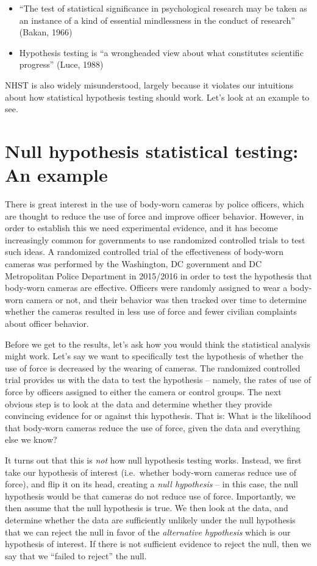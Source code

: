 \documentclass[]{book}
\providecommand{\tightlist}{%
  \setlength{\itemsep}{0pt}\setlength{\parskip}{0pt}}
\theoremstyle{definition}
\theoremstyle{definition}
\theoremstyle{definition}
\theoremstyle{remark}
\begin{document}
\begin{itemize}
\tightlist
\item
  ``The test of statistical significance in psychological research may
  be taken as an instance of a kind of essential mindlessness in the
  conduct of research'' (Bakan, 1966)
\item
  Hypothesis testing is ``a wrongheaded view about what constitutes
  scientific progress'' (Luce, 1988)
\end{itemize}

NHST is also widely misunderstood, largely because it violates our
intuitions about how statistical hypothesis testing should work. Let's
look at an example to see.

\section{Null hypothesis statistical testing: An
example}\label{null-hypothesis-statistical-testing-an-example}

There is great interest in the use of body-worn cameras by police
officers, which are thought to reduce the use of force and improve
officer behavior. However, in order to establish this we need
experimental evidence, and it has become increasingly common for
governments to use randomized controlled trials to test such ideas. A
randomized controlled trial of the effectiveness of body-worn cameras
was performed by the Washington, DC government and DC Metropolitan
Police Department in 2015/2016 in order to test the hypothesis that
body-worn cameras are effective. Officers were randomly assigned to wear
a body-worn camera or not, and their behavior was then tracked over time
to determine whether the cameras resulted in less use of force and fewer
civilian complaints about officer behavior.

Before we get to the results, let's ask how you would think the
statistical analysis might work. Let's say we want to specifically test
the hypothesis of whether the use of force is decreased by the wearing
of cameras. The randomized controlled trial provides us with the data to
test the hypothesis -- namely, the rates of use of force by officers
assigned to either the camera or control groups. The next obvious step
is to look at the data and determine whether they provide convincing
evidence for or against this hypothesis. That is: What is the likelihood
that body-worn cameras reduce the use of force, given the data and
everything else we know?

It turns out that this is \emph{not} how null hypothesis testing works.
Instead, we first take our hypothesis of interest (i.e.~whether
body-worn cameras reduce use of force), and flip it on its head,
creating a \emph{null hypothesis} -- in this case, the null hypothesis
would be that cameras do not reduce use of force. Importantly, we then
assume that the null hypothesis is true. We then look at the data, and
determine whether the data are sufficiently unlikely under the null
hypothesis that we can reject the null in favor of the \emph{alternative
hypothesis} which is our hypothesis of interest. If there is not
sufficient evidence to reject the null, then we say that we ``failed to
reject'' the null.
\end{document}
